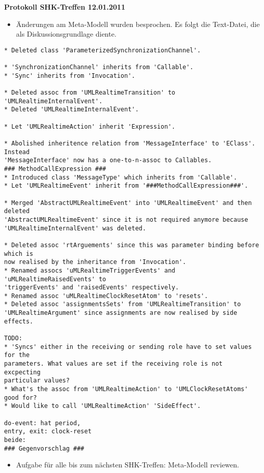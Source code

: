 \documentclass[11pt,a4paper]{article}
\begin{document}
\begin{center}

\textbf{\huge Protokoll SHK-Treffen 12.01.2011}\\[0.9cm]

\end{center}

\begin{itemize}
  \item Änderungen am Meta-Modell wurden besprochen. Es folgt die Text-Datei,
  die als Diskussionsgrundlage diente.
\end{itemize}

\begin{verbatim}
* Deleted class 'ParameterizedSynchronizationChannel'.

* 'SynchronizationChannel' inherits from 'Callable'.
* 'Sync' inherits from 'Invocation'.

* Deleted assoc from 'UMLRealtimeTransition' to 'UMLRealtimeInternalEvent'.
* Deleted 'UMLRealtimeInternalEvent'.

* Let 'UMLRealtimeAction' inherit 'Expression'.

* Abolished inheritence relation from 'MessageInterface' to 'EClass'. Instead
'MessageInterface' now has a one-to-n-assoc to Callables.
### MethodCallExpression ###
* Introduced class 'MessageType' which inherits from 'Callable'.
* Let 'UMLRealtimeEvent' inherit from '###MethodCallExpression###'.

* Merged 'AbstractUMLRealtimeEvent' into 'UMLRealtimeEvent' and then deleted
'AbstractUMLRealtimeEvent' since it is not required anymore because
'UMLRealtimeInternalEvent' was deleted.

* Deleted assoc 'rtArguements' since this was parameter binding before which is
now realised by the inheritance from 'Invocation'.
* Renamed assocs 'uMLRealtimeTriggerEvents' and 'uMLRealtimeRaisedEvents' to
'triggerEvents' and 'raisedEvents' respectively.
* Renamed assoc 'uMLRealtimeClockResetAtom' to 'resets'.
* Deleted assoc 'assignmentsSets' from 'UMLRealtimeTransition' to
'UMLRealtimeArgument' since assignments are now realised by side effects.

TODO:
* 'Syncs' either in the receiving or sending role have to set values for the
parameters. What values are set if the receiving role is not excpecting
particular values?
* What's the assoc from 'UMLRealtimeAction' to 'UMLClockResetAtoms' good for?
* Would like to call 'UMLRealtimeAction' 'SideEffect'.

do-event: hat period,
entry, exit: clock-reset
beide: 
### Gegenvorschlag ###
\end{verbatim}

\begin{itemize}
  \item Aufgabe für alle bis zum nächsten SHK-Treffen: Meta-Modell reviewen.
\end{itemize}
\end{document}
